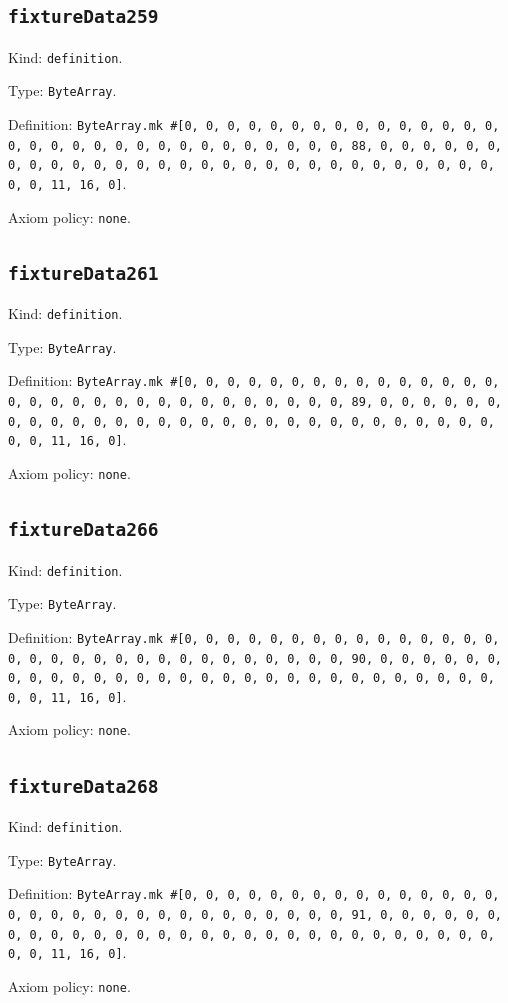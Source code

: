 \documentclass[11pt]{article}
\begin{document}
\subsection*{\texttt{fixtureData259}}
\noindent Kind: \texttt{definition}.\par
\noindent Type: \texttt{ByteArray}.\par
\noindent Definition: \texttt{ByteArray.mk \#[0, 0, 0, 0, 0, 0, 0, 0, 0, 0, 0, 0, 0, 0, 0, 0, 0, 0, 0, 0, 0, 0, 0, 0, 0, 0, 0, 0, 0, 0, 0, 88, 0, 0, 0, 0, 0, 0, 0, 0, 0, 0, 0, 0, 0, 0, 0, 0, 0, 0, 0, 0, 0, 0, 0, 0, 0, 0, 0, 0, 0, 0, 0, 11, 16, 0]}.\par
\noindent Axiom policy: \texttt{none}.\par
\subsection*{\texttt{fixtureData261}}
\noindent Kind: \texttt{definition}.\par
\noindent Type: \texttt{ByteArray}.\par
\noindent Definition: \texttt{ByteArray.mk \#[0, 0, 0, 0, 0, 0, 0, 0, 0, 0, 0, 0, 0, 0, 0, 0, 0, 0, 0, 0, 0, 0, 0, 0, 0, 0, 0, 0, 0, 0, 0, 89, 0, 0, 0, 0, 0, 0, 0, 0, 0, 0, 0, 0, 0, 0, 0, 0, 0, 0, 0, 0, 0, 0, 0, 0, 0, 0, 0, 0, 0, 0, 0, 11, 16, 0]}.\par
\noindent Axiom policy: \texttt{none}.\par
\subsection*{\texttt{fixtureData266}}
\noindent Kind: \texttt{definition}.\par
\noindent Type: \texttt{ByteArray}.\par
\noindent Definition: \texttt{ByteArray.mk \#[0, 0, 0, 0, 0, 0, 0, 0, 0, 0, 0, 0, 0, 0, 0, 0, 0, 0, 0, 0, 0, 0, 0, 0, 0, 0, 0, 0, 0, 0, 0, 90, 0, 0, 0, 0, 0, 0, 0, 0, 0, 0, 0, 0, 0, 0, 0, 0, 0, 0, 0, 0, 0, 0, 0, 0, 0, 0, 0, 0, 0, 0, 0, 11, 16, 0]}.\par
\noindent Axiom policy: \texttt{none}.\par
\subsection*{\texttt{fixtureData268}}
\noindent Kind: \texttt{definition}.\par
\noindent Type: \texttt{ByteArray}.\par
\noindent Definition: \texttt{ByteArray.mk \#[0, 0, 0, 0, 0, 0, 0, 0, 0, 0, 0, 0, 0, 0, 0, 0, 0, 0, 0, 0, 0, 0, 0, 0, 0, 0, 0, 0, 0, 0, 0, 91, 0, 0, 0, 0, 0, 0, 0, 0, 0, 0, 0, 0, 0, 0, 0, 0, 0, 0, 0, 0, 0, 0, 0, 0, 0, 0, 0, 0, 0, 0, 0, 11, 16, 0]}.\par
\noindent Axiom policy: \texttt{none}.\par
\end{document}
